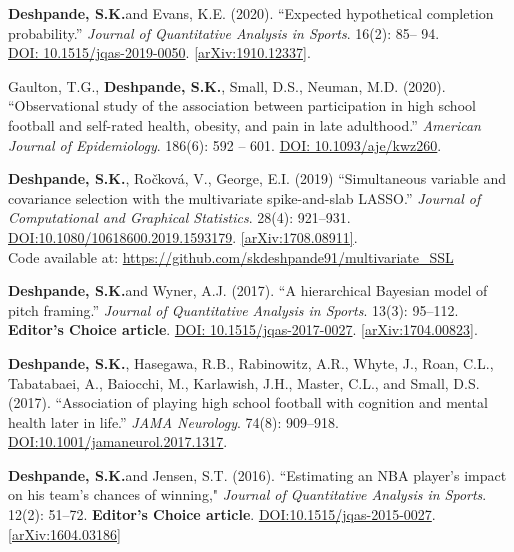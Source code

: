 \documentclass[margin]{res}
\def\skd{\textbf{Deshpande, S.K.}}
\begin{document}
\begin{resume}
\skd and Evans, K.E. (2020). ``Expected hypothetical completion probability.'' \textit{Journal of Quantitative Analysis in Sports}. 16(2): 85-- 94.\\ \href{https://doi.org/10.1515/jqas-2019-0050}{DOI: 10.1515/jqas-2019-0050}. \href{https://arxiv.org/abs/1910.12337}{[arXiv:1910.12337]}.

Gaulton, T.G., \skd, Small, D.S., Neuman, M.D. (2020). ``Observational study of the association between participation in high school football and self-rated health, obesity, and pain in late adulthood.'' \textit{American Journal of Epidemiology}. 186(6): 592 -- 601. \href{https://doi.org/10.1093/aje/kwz260}{DOI: 10.1093/aje/kwz260}.

\skd, Ro\v{c}kov\'{a}, V.,  George, E.I. (2019) ``Simultaneous variable and covariance selection with the multivariate spike-and-slab LASSO.'' \textit{Journal of Computational and Graphical Statistics}. 28(4): 921--931. \href{https://doi.org/10.1080/10618600.2019.1593179}{DOI:10.1080/10618600.2019.1593179}. \href{https://arxiv.org/abs/1708.08911}{[arXiv:1708.08911]}. \\ Code available at: \url{https://github.com/skdeshpande91/multivariate_SSL}

\skd and Wyner, A.J. (2017). ``A hierarchical Bayesian model of pitch framing.'' \textit{Journal of Quantitative Analysis in Sports}. 13(3): 95--112. \textbf{Editor's Choice article}.   \href{https://doi.org/10.1515/jqas-2017-0027}{DOI: 10.1515/jqas-2017-0027}. \href{https://arxiv.org/abs/1704.00823}{[arXiv:1704.00823]}.

\skd, Hasegawa, R.B., Rabinowitz, A.R., Whyte, J., Roan, C.L., Tabatabaei, A., Baiocchi, M., Karlawish, J.H., Master, C.L., and Small, D.S. (2017). ``Association of playing high school football with cognition and mental health later in life.'' \textit{JAMA Neurology}. 74(8): 909--918. \href{https://doi.org/10.1001/jamaneurol.2017.1317}{DOI:10.1001/jamaneurol.2017.1317}.

\skd and Jensen, S.T. (2016). ``Estimating an NBA player's impact on his team's chances of winning," \textit{Journal of Quantitative Analysis in Sports}. 12(2): 51--72. \textbf{Editor's Choice article}.  \href{https://doi.org/10.1515/jqas-2015-0027}{DOI:10.1515/jqas-2015-0027}.\href{https://arxiv.org/abs/1604.03186}{[arXiv:1604.03186]}



\end{resume}
\end{document}
